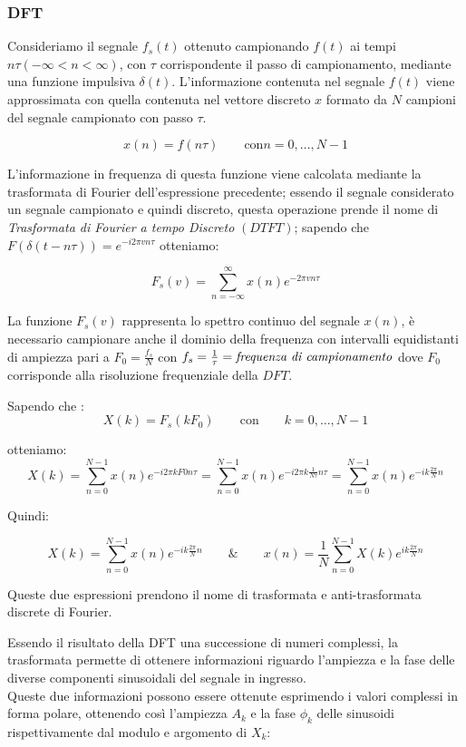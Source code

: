 \documentclass[12pt]{report}
\begin{document}
		\subsubsection{DFT}
		\label{cap2sec3_4}
		Consideriamo il segnale $f_s(t)$ ottenuto campionando $f(t)$ ai tempi $n\tau(-\infty < n < \infty)$, con $\tau$ corrispondente il passo di campionamento, mediante una funzione impulsiva $\delta(t)$. L'informazione contenuta nel segnale $f(t)$ viene approssimata con quella contenuta nel vettore discreto $x$ formato da $N$ campioni del segnale campionato con passo $\tau$.

$$ x(n) = f(n\tau) \qquad \mbox{con} n=0,\dots,N-1 $$

L'informazione in frequenza di questa funzione viene calcolata mediante la trasformata di Fourier dell'espressione precedente; essendo il segnale considerato un segnale campionato e quindi discreto, questa operazione prende il nome di {\itshape Trasformata di Fourier a tempo Discreto} $(DTFT)$; sapendo che $F(\delta(t-n\tau)) = e^{-i2\pi vn\tau} $ otteniamo:

$$ F_s(v) = \sum_{n = -\infty}^\infty x(n)e^{-2\pi vn\tau} $$

La funzione $F_s(v)$ rappresenta lo spettro continuo del segnale $x(n)$, è necessario campionare anche il dominio della frequenza con intervalli equidistanti di ampiezza pari a $F_0 = \frac{f_s}{N}$ con $f_s = \frac{1}{\tau} = \mbox{\itshape frequenza di campionamento}$ dove $F_0$ corrisponde alla risoluzione frequenziale della $DFT$.

Sapendo che :
$$ X(k) = F_s(kF_0) \qquad \mbox{con} \qquad k = 0,\dots,N-1 $$

otteniamo:
$$ X(k) = \sum_{n=0}^{N-1} x(n)e^{-i2\pi kF0n\tau} = 
		\sum_{n=0}^{N-1} x(n)e^{-i2\pi k\frac{1}{N\tau}n\tau} =
			\sum_{n=0}^{N-1} x(n)e^{-ik\frac{2\pi}{N}n}	$$

Quindi:

$$ X(k) = \sum_{n = 0}^{N-1} x(n)e^{-ik\frac{2\pi}{N}n} \qquad \mbox{\&} \qquad
	x(n) = \frac{1}{N}\sum_{n=0}^{N-1} X(k)e^{ik\frac{2\pi}{N}n} $$

Queste due espressioni prendono il nome di trasformata e anti-trasformata discrete di Fourier.

Essendo il risultato della DFT una successione di numeri complessi, la trasformata permette di ottenere informazioni riguardo l'ampiezza e la fase delle diverse componenti sinusoidali del segnale in ingresso.\\
Queste due informazioni possono essere ottenute esprimendo i valori complessi in forma polare, ottenendo così l'ampiezza $A_k$ e la fase $\phi_k$ delle sinusoidi rispettivamente dal modulo e argomento di $X_k$:
\end{document}
